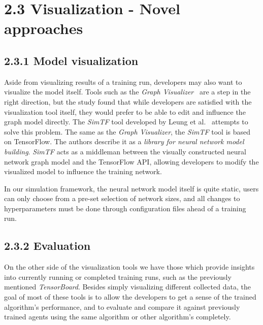 \section*{2.3 Visualization - Novel approaches}

\subsection*{2.3.1 Model visualization}

Aside from visualizing results of a training run, developers may also want to visualize the model itself. Tools such as the \emph{Graph Visualizer}~\cite{GraphVisualizer} are a step in the right direction, but the study found that while developers are satisfied with the visualization tool itself, they would prefer to be able to edit and influence the graph model directly. The \emph{SimTF} tool developed by Leung et al.~\cite{NeuralNetworkVisualization} attempts to solve this problem. The same as the \emph{Graph Visualizer}, the \emph{SimTF} tool is based on TensorFlow. The authors describe it as a \emph{library for neural network model building}. \emph{SimTF} acts as a middleman between the visually constructed neural network graph model and the TensorFlow API, allowing developers to modify the visualized model to influence the training network.

In our simulation framework, the neural network model itself is quite static, users can only choose from a pre-set selection of network sizes, and all changes to hyperparameters must be done through configuration files ahead of a training run.

\subsection*{2.3.2 Evaluation}

On the other side of the visualization tools we have those which provide insights into currently running or completed training runs, such as the previously mentioned \emph{TensorBoard}. Besides simply visualizing different collected data, the goal of most of these tools is to allow the developers to get a sense of the trained algorithm's performance, and to evaluate and compare it against previously trained agents using the same algorithm or other algorithm's completely.

